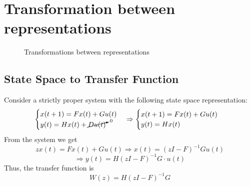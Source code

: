 \section{Transformation between representations}
\begin{figure}[H]
    \centering
    \caption*{Transformations between representations}
\end{figure}

\subsection{State Space to Transfer Function}
Consider a strictly proper system with the following state space representation:
\[
\begin{cases}
    x(t+1) = F x(t) + G u(t)\\
    y(t) = H x(t) + \cancelto{0}{D u(t)}\\
\end{cases}
\Rightarrow
\begin{cases}
    x(t+1) = F x(t) + G u(t)\\
    y(t) = H x(t)\\
\end{cases}
\]
From the system we get
\[ z x(t) = F x(t) + G u(t) \Rightarrow x(t) = (zI - F)^{-1} G u(t) \]
\[ \Rightarrow y(t) = H (zI - F)^{-1} G \cdot u(t) \]
Thus, the transfer function is
\[ W(z) = H(zI - F) ^ {-1} G \]

